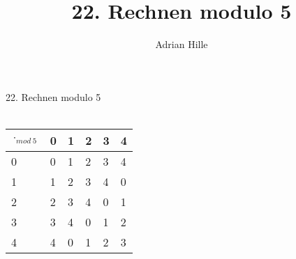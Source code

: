 \documentclass{scrartcl}
\title{22. Rechnen modulo 5}
\author{Adrian Hille}
\begin{document}
\Large 22. Rechnen modulo 5\\
\\
\normalsize
\begin{table}[H]
\begin{tabular}{l|l|l|l|l|l}
	$\cdot_{mod~5} $ & 0 & 1 & 2 & 3 & 4\\
	\hline
	0 & 0 & 1 & 2 & 3 & 4 \\
	\hline
	1 & 1 & 2 & 3 & 4 & 0\\
	\hline
	2 & 2 & 3 & 4 & 0 & 1\\
	\hline
	3 & 3 & 4 & 0 & 1 & 2\\
	\hline
	4 & 4 & 0 & 1 & 2 & 3\\
\end{tabular}
\end{table}
\end{document}
